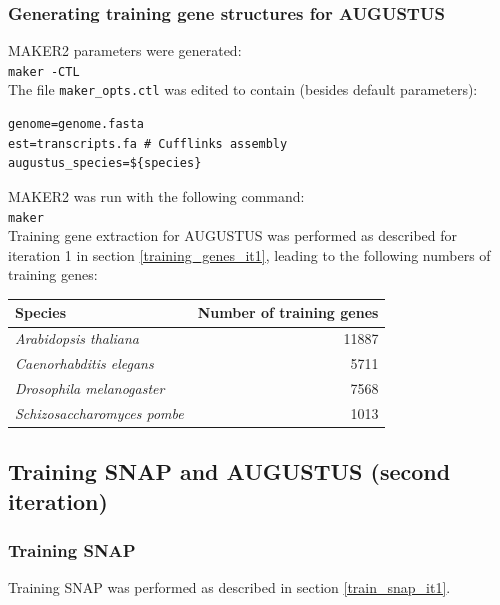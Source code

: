 \documentclass[a4paper,10pt]{report}
\begin{document}
\subsubsection{Generating training gene structures for AUGUSTUS}

MAKER2 parameters were generated:\\

\noindent \texttt{maker -CTL}\\

\noindent The file \texttt{maker\_opts.ctl} was edited to contain (besides default parameters):

\begin{verbatim}
genome=genome.fasta
est=transcripts.fa # Cufflinks assembly
augustus_species=${species}
\end{verbatim}

\noindent MAKER2 was run with the following command:\\

\noindent \texttt{maker}\\

\noindent Training gene extraction for AUGUSTUS was performed as described for iteration 1 in section \ref{training_genes_it1}, leading to the following numbers of training genes:

\begin{center}
\begin{tabular}{l r}
\hline
Species & Number of training genes\\
\hline
\textit{Arabidopsis thaliana} & 11887\\
\textit{Caenorhabditis elegans} & 5711\\
\textit{Drosophila melanogaster} & 7568\\
\textit{Schizosaccharomyces pombe} & 1013\\
\hline
\end{tabular}
\end{center}

\subsection{Training SNAP and AUGUSTUS (second iteration)}

\subsubsection{Training SNAP}

Training SNAP was performed as described in section \ref{train_snap_it1}.
\end{document}
